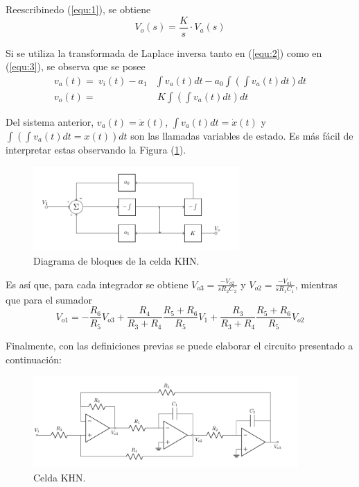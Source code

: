 Reescribinedo (\ref{equ:1}), se obtiene
\begin{equation}
	V_o(s) = \frac{K}{s} \cdot V_a(s)
	\label{equ:3}
\end{equation}

Si se utiliza la transformada de Laplace inversa tanto en (\ref{equ:2}) como en (\ref{equ:3}), se observa que se posee
\begin{equation}
\begin{split}
	v_a(t) =\ v_i(t) - a_1 & \int v_a(t)dt - a_0 \int \left( \int v_a(t)dt \right) dt \\
	v_o(t) =& \ K\int \left( \int v_a(t)dt \right) dt
\end{split}
\end{equation}

Del sistema anterior, $v_a(t) = \ddot{x}(t) $, $\int v_a(t)dt = \dot{x}(t)$ y $\int \left( \int v_a(t)dt = x(t) \right) dt$ son las llamadas variables de estado. Es más fácil de interpretar estas observando la Figura (\ref{fig:block}).

\begin{figure}[H]
\centering
	\includegraphics[width=0.7\textwidth]{ImagenesEjercicio4/Diagrama-De-Bloques.pdf}
	\caption{Diagrama de bloques de la celda KHN.}
	\label{fig:block}
\end{figure}

Es así que, para cada integrador se obtiene $V_{o3} = \frac{-V_{o2}}{sR_2C_2}$ y
$V_{o2} = \frac{-V_{o1}}{sR_1C_1}$, mientras que para el sumador
\begin{equation*}
	V_{o1} = -\frac{R_6}{R_5} V_{o3} + \frac{R_4}{R_3 + R_4} \frac{R_5 + R_6}{R_5} V_1 + \frac{R_3}{R_3 + R_4} \frac{R_5 + R_6}{R_5} V_{o2}
\end{equation*}

Finalmente, con las definiciones previas se puede elaborar el circuito presentado a continuación:
\begin{figure}[H]
\centering
	\includegraphics[width=0.9\textwidth]{ImagenesEjercicio4/KHN.pdf}
	\caption{Celda KHN.}
	\label{fig:KHN}
\end{figure}

